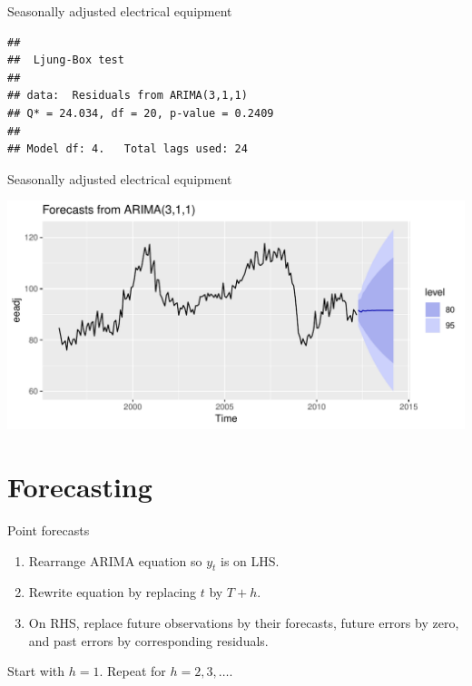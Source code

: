 \documentclass[14pt,ignorenonframetext,]{beamer}
\newenvironment{Shaded}{\begin{snugshade}}{\end{snugshade}}
\newcommand{\StringTok}[1]{\textcolor[rgb]{0.31,0.60,0.02}{#1}}
\newcommand{\OperatorTok}[1]{\textcolor[rgb]{0.81,0.36,0.00}{\textbf{#1}}}
\newcommand{\NormalTok}[1]{#1}
\providecommand{\tightlist}{%
  \setlength{\itemsep}{0pt}\setlength{\parskip}{0pt}}
\begin{document}
\begin{frame}[fragile]{\large Seasonally adjusted electrical equipment}

\begin{verbatim}
## 
##  Ljung-Box test
## 
## data:  Residuals from ARIMA(3,1,1)
## Q* = 24.034, df = 20, p-value = 0.2409
## 
## Model df: 4.   Total lags used: 24
\end{verbatim}

\end{frame}

\begin{frame}[fragile]{\large Seasonally adjusted electrical equipment}

\begin{Shaded}
\end{Shaded}

\includegraphics{week_5_arima_files/figure-beamer/unnamed-chunk-41-1.pdf}

\end{frame}

\section{Forecasting}\label{forecasting}

\begin{frame}{Point forecasts}

\begin{enumerate}
\def\labelenumi{\arabic{enumi}.}
\tightlist
\item
  Rearrange ARIMA equation so \(y_t\) is on LHS.
\item
  Rewrite equation by replacing \(t\) by \(T+h\).
\item
  On RHS, replace future observations by their forecasts, future errors
  by zero, and past errors by corresponding residuals.
\end{enumerate}

Start with \(h=1\). Repeat for \(h=2,3,\dots\).

\end{frame}
\end{document}
